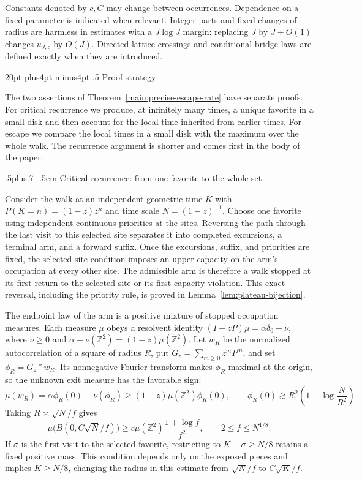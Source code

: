 \documentclass[12pt,reqno]{amsart}
\makeatletter
\def\section{\@startsection{section}{1}{0pt}%
  {20pt plus4pt minus4pt}
  {.5\linespacing}
  {\normalfont\bfseries}}
\def\subsection{\@startsection{subsection}{2}{0pt}%
  {.5\linespacing plus.7\linespacing}
  {-.5em}
  {\normalfont\scshape}}
\theoremstyle{plain}
\theoremstyle{definition}
\theoremstyle{remark}
\numberwithin{equation}{section}
\makeatother
\begin{document}
Constants denoted by $c,C$ may change between occurrences. Dependence on a
fixed parameter is indicated when relevant. Integer parts and fixed changes
of radius are harmless in estimates with a $J\log J$ margin: replacing $J$
by $J+O(1)$ changes $u_{J,c}$ by $O(J)$. Directed lattice crossings and
conditional bridge laws are defined exactly when they are introduced.


\section{Proof strategy}\label{sec:proof-ideas}

The two assertions of Theorem~\ref{main:precise-escape-rate} have separate
proofs. For critical recurrence we produce, at infinitely many times, a
unique favorite in a small disk and then account for the local time inherited
from earlier times. For escape we compare the local times in a small disk
with the maximum over the whole walk. The recurrence argument is shorter and
comes first in the body of the paper.

\subsection{Critical recurrence: from one favorite to the whole set}

Consider the walk at an independent geometric time $K$ with
$P(K=n)=(1-z)z^n$ and time scale $N=(1-z)^{-1}$. Choose one favorite using
independent continuous priorities at the sites. Reversing the path through
the last visit to this selected site separates it into completed excursions,
a terminal arm, and a forward suffix. Once the excursions, suffix, and
priorities are fixed, the selected-site condition imposes an upper capacity
on the arm's occupation at every other site. The admissible arm is therefore
a walk stopped at its first return to the selected site or its first capacity
violation. This exact reversal, including the priority rule, is proved in
Lemma~\ref{lem:plateau-bijection}.

The endpoint law of the arm is a positive mixture of stopped occupation
measures. Each measure $\mu$ obeys a resolvent identity
$(I-zP)\mu=\alpha\delta_0-\nu$, where $\nu\ge0$ and
$\alpha-\nu(\mathbb Z^2)=(1-z)\mu(\mathbb Z^2)$. Let $w_R$ be the
normalized autocorrelation of a square of radius $R$, put
$G_z=\sum_{m\ge0}z^mP^m$, and set $\phi_R=G_z*w_R$.
Its nonnegative Fourier transform makes $\phi_R$ maximal at the origin,
so the unknown exit measure has the favorable sign:
\[
 \mu(w_R)=\alpha\phi_R(0)-\nu(\phi_R)
 \ge(1-z)\mu(\mathbb Z^2)\phi_R(0),\qquad
 \phi_R(0)\gtrsim R^2\left(1+\log\frac N{R^2}\right).
\]
Taking $R\asymp\sqrt N/f$ gives
\begin{equation}\label{eq:ideas-resolvent-gain}
 \mu\bigl(B(0,C\sqrt N/f)\bigr)
 \ge c\mu(\mathbb Z^2)\frac{1+\log f}{f^2},
 \qquad 2\le f\le N^{1/8}.
\end{equation}
If $\sigma$ is the first visit to the selected favorite, restricting to
$K-\sigma\ge N/8$ retains a fixed positive mass. This condition depends
only on the exposed pieces and implies $K\ge N/8$, changing the radius
in this estimate from $\sqrt N/f$ to $C\sqrt K/f$.
\end{document}
